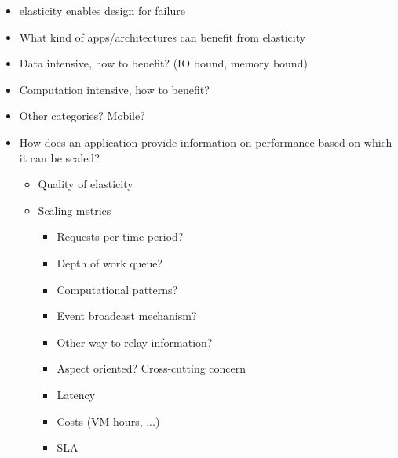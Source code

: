 \documentclass[english]{tktltiki2}
\theoremstyle{definition}
\theoremstyle{remark}
\begin{document}
\begin{itemize}
\item elasticity enables design for failure
\item What kind of apps/architectures can benefit from elasticity
\item Data intensive, how to benefit? (IO bound, memory bound)
\item Computation intensive, how to benefit? 
\item Other categories? Mobile?
\item How does an application provide information on performance based on which it can be scaled?
	\begin{itemize}
	\item Quality of elasticity
	\item Scaling metrics
		\begin{itemize}
		\item Requests per time period?
		\item Depth of work queue?
		\item Computational patterns?
		\item Event broadcast mechanism?
		\item Other way to relay information?
		\item Aspect oriented? Cross-cutting concern
		\item Latency
		\item Costs (VM hours, ...)
		\item SLA
		\end{itemize}
	\end{itemize}
\end{itemize}





\end{document}
